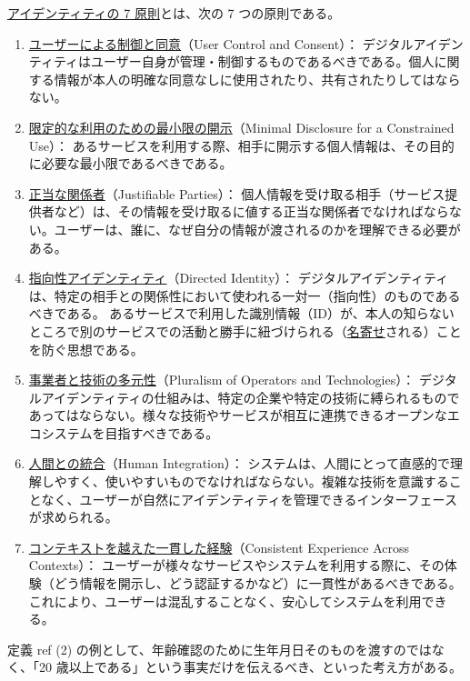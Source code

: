 \documentclass[uplatex]{jsarticle}
\def\ref#1{ref}%
\def\label#1{}%
\begin{document}
\begin{dfn}[アイデンティティの 7 原則]\label{dfn:laws-of-identity}
\underline{アイデンティティの 7 原則}とは、次の 7 つの原則である。
\begin{enumerate}
\item \underline{ユーザーによる制御と同意}（User Control and Consent）：
デジタルアイデンティティはユーザー自身が管理・制御するものであるべきである。個人に関する情報が本人の明確な同意なしに使用されたり、共有されたりしてはならない。
\item \underline{限定的な利用のための最小限の開示}（Minimal Disclosure for a Constrained Use）：
あるサービスを利用する際、相手に開示する個人情報は、その目的に必要な最小限であるべきである。
\item \underline{正当な関係者}（Justifiable Parties）：
個人情報を受け取る相手（サービス提供者など）は、その情報を受け取るに値する正当な関係者でなければならない。ユーザーは、誰に、なぜ自分の情報が渡されるのかを理解できる必要がある。
\item \underline{指向性アイデンティティ}（Directed Identity）：
デジタルアイデンティティは、特定の相手との関係性において使われる一対一（指向性）のものであるべきである。
あるサービスで利用した識別情報（ID）が、本人の知らないところで別のサービスでの活動と勝手に紐づけられる（\underline{名寄せ}される）ことを防ぐ思想である。
\item \underline{事業者と技術の多元性}（Pluralism of Operators and Technologies）：
デジタルアイデンティティの仕組みは、特定の企業や特定の技術に縛られるものであってはならない。様々な技術やサービスが相互に連携できるオープンなエコシステムを目指すべきである。
\item \underline{人間との統合}（Human Integration）：
システムは、人間にとって直感的で理解しやすく、使いやすいものでなければならない。複雑な技術を意識することなく、ユーザーが自然にアイデンティティを管理できるインターフェースが求められる。
\item \underline{コンテキストを越えた一貫した経験}（Consistent Experience Across Contexts）：
ユーザーが様々なサービスやシステムを利用する際に、その体験（どう情報を開示し、どう認証するかなど）に一貫性があるべきである。
これにより、ユーザーは混乱することなく、安心してシステムを利用できる。
\end{enumerate}
\end{dfn}

\begin{exa}[年齢確認における最小限の開示]\label{exa:ch5-age-minimal-disclosure}
定義 \ref{dfn:laws-of-identity} (2) の例として、年齢確認のために生年月日そのものを渡すのではなく、「20 歳以上である」という事実だけを伝えるべき、といった考え方がある。
\end{exa}
\end{document}
